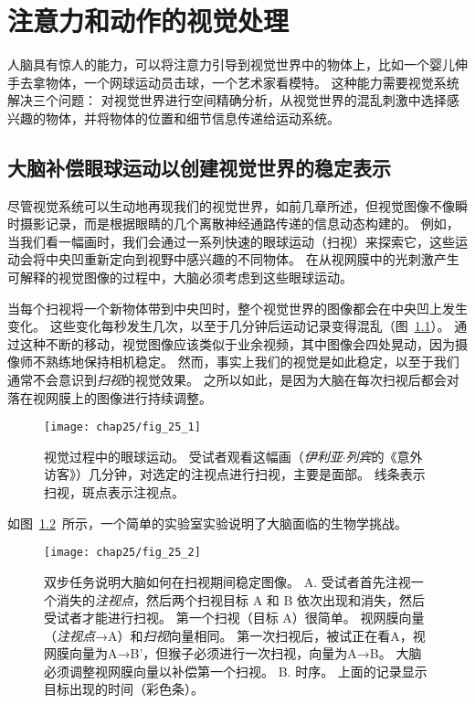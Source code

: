 \chapter{注意力和动作的视觉处理} \label{chap:chap25}

人脑具有惊人的能力，可以将注意力引导到视觉世界中的物体上，比如一个婴儿伸手去拿物体，一个网球运动员击球，一个艺术家看模特。
这种能力需要视觉系统解决三个问题：
对视觉世界进行空间精确分析，从视觉世界的混乱刺激中选择感兴趣的物体，并将物体的位置和细节信息传递给运动系统。



\section{大脑补偿眼球运动以创建视觉世界的稳定表示}

尽管视觉系统可以生动地再现我们的视觉世界，如前几章所述，但视觉图像不像瞬时摄影记录，而是根据眼睛的几个离散神经通路传递的信息动态构建的。
例如，当我们看一幅画时，我们会通过一系列快速的眼球运动（扫视）来探索它，这些运动会将中央凹重新定向到视野中感兴趣的不同物体。
在从视网膜中的光刺激产生可解释的视觉图像的过程中，大脑必须考虑到这些眼球运动。


当每个扫视将一个新物体带到中央凹时，整个视觉世界的图像都会在中央凹上发生变化。
这些变化每秒发生几次，以至于几分钟后运动记录变得混乱（图~\ref{fig:25_1}）。
通过这种不断的移动，视觉图像应该类似于业余视频，其中图像会四处晃动，因为摄像师不熟练地保持相机稳定。
然而，事实上我们的视觉是如此稳定，以至于我们通常不会意识到\textit{扫视}的视觉效果。
之所以如此，是因为大脑在每次扫视后都会对落在视网膜上的图像进行持续调整。


\begin{figure}[htbp]
	\centering
	\texttt{[image: chap25/fig\_25\_1]}
	\caption{视觉过程中的眼球运动。
		受试者观看这幅画（\textit{伊利亚$\cdot$列宾}的《意外访客》）几分钟，对选定的注视点进行扫视，主要是面部。
		线条表示扫视，斑点表示注视点。}
	\label{fig:25_1}
\end{figure}


如图~\ref{fig:25_2}~所示，一个简单的实验室实验说明了大脑面临的生物学挑战。


\begin{figure}[htbp]
	\centering
	\texttt{[image: chap25/fig\_25\_2]}
	\caption{双步任务说明大脑如何在扫视期间稳定图像。
		A. 受试者首先注视一个消失的\textit{注视点}，然后两个扫视目标 A 和 B 依次出现和消失，然后受试者才能进行扫视。
		第一个扫视（目标 A）很简单。
		视网膜向量（\textit{注视点}→A）和\textit{扫视}向量相同。
		第一次扫视后，被试正在看A，视网膜向量为A→B'，但猴子必须进行一次扫视，向量为A→B。
		大脑必须调整视网膜向量以补偿第一个扫视。
		B. 时序。
		上面的记录显示目标出现的时间（彩色条）。}
	\label{fig:25_2}
\end{figure}



